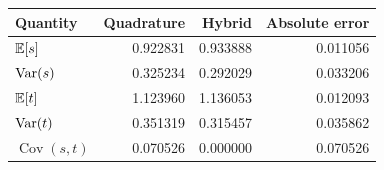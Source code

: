 \begin{tabular}{@{}lrrr@{}}
\toprule
Quantity & Quadrature & Hybrid & Absolute error \\
\midrule
$\mathbb E[s]$ & 0.922831 & 0.933888 & 0.011056 \\
$\operatorname{Var}(s)$ & 0.325234 & 0.292029 & 0.033206 \\
$\mathbb E[t]$ & 1.123960 & 1.136053 & 0.012093 \\
$\operatorname{Var}(t)$ & 0.351319 & 0.315457 & 0.035862 \\
$\operatorname{Cov}(s,t)$ & 0.070526 & 0.000000 & 0.070526 \\
\bottomrule
\end{tabular}
